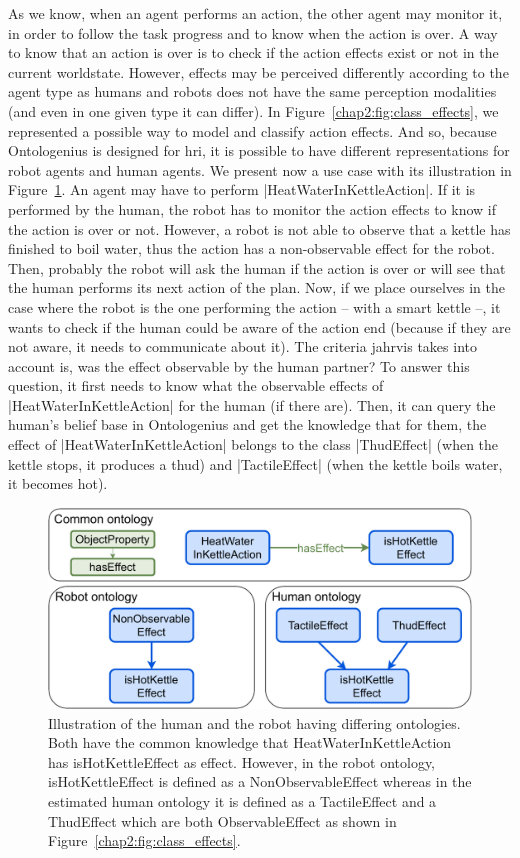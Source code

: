 \documentclass[a4paper,11pt,twoside]{StyleThese}
\begin{document}
As we know, when an agent performs an action, the other agent may monitor it, in order to follow the task progress and to know when the action is over. A way to know that an action is over is to check if the action effects exist or not in the current worldstate. However, effects may be perceived differently according to the agent type as humans and robots does not have the same perception modalities (and even in one given type it can differ). In Figure~\ref{chap2:fig:class_effects}, we represented a possible way to model and classify action effects. And so, because Ontologenius is designed for \acrshort{hri}, it is possible to have different representations for robot agents and human agents. We present now a use case with its illustration in Figure~\ref{chap2:fig:kettle}. An agent may have to perform |HeatWaterInKettleAction|. If it is performed by the human, the robot has to monitor the action effects to know if the action is over or not. However, a robot is not able to observe that a kettle has finished to boil water, thus the action has a non-observable effect for the robot. Then, probably the robot will ask the human if the action is over or will see that the human performs its next action of the plan. Now, if we place ourselves in the case where the robot is the one performing the action -- with a smart kettle --, it wants to check if the human could be aware of the action end (because if they are not aware, it needs to communicate about it). The criteria \acrshort{jahrvis} takes into account is, was the effect observable by the human partner? To answer this question, it first needs to know what the observable effects of |HeatWaterInKettleAction| for the human (if there are). Then, it can query the human's belief base in Ontologenius and get the knowledge that for them, the effect of |HeatWaterInKettleAction| belongs to the class |ThudEffect| (when the kettle stops, it produces a thud) and |TactileEffect| (when the kettle boils water, it becomes hot).
	
\begin{figure}[!ht]
	\includegraphics[width=\linewidth]{figures/chapter2/kettle.pdf}
	\caption{Illustration of the human and the robot having differing ontologies. Both have the common knowledge that HeatWaterInKettleAction has isHotKettleEffect as effect. However, in the robot ontology, isHotKettleEffect is defined as a NonObservableEffect whereas in the estimated human ontology it is defined as a TactileEffect and a ThudEffect which are both ObservableEffect as shown in Figure~\ref{chap2:fig:class_effects}.}
	\label{chap2:fig:kettle}
\end{figure}
\end{document}
